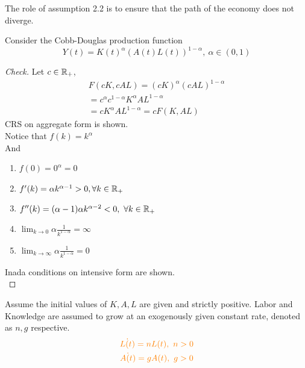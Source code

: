 \documentclass[11pt]{article}
\begin{document}
			\begin{remark}	
			The role of assumption 2.2 is to ensure that the path of the economy does not diverge.
			\end{remark}
			
			\begin{example}
				Consider the Cobb-Douglas production function
				\[
					Y(t) = K(t)^\alpha (A(t)L(t))^{1 - \alpha},\ \alpha \in (0, 1)
				\]
				
				\begin{proof}[Check]
					Let $c \in \mathbb{R}_+$, 
					\begin{gather*}
						F(cK, cAL) = (cK)^\alpha (cAL)^{1 - \alpha} \\
						= c^\alpha c^{1-\alpha} K^\alpha AL^{1-\alpha} \\
						= cK^{\alpha} AL^{1-\alpha} = cF(K, AL)
					\end{gather*}
					CRS on aggregate form is shown. \\
					Notice that $f(k) = k^{\alpha}$ \\
					And 
					\begin{enumerate}
						\item $f(0) = 0^{\alpha} = 0$
						\item $f'(k) = \alpha k ^ {\alpha - 1} > 0, \forall k \in \mathbb{R}_+$
						\item $f''(k) = (\alpha - 1)\alpha k ^ {\alpha - 2} < 0, \ \forall k \in \mathbb{R}_+$
						\item $\lim_{k \to 0} \alpha \frac{1}{k^{1-\alpha}} = \infty$
						\item $\lim_{k \to \infty} \alpha \frac{1}{k^{1-\alpha}} = 0$
					\end{enumerate}
					Inada conditions on intensive form are shown. \\
				\end{proof}
			\end{example}
			
			\begin{assumption}
				Assume the initial values of $K, A, L$ are given and strictly positive. Labor and Knowledge are assumed to grow at an exogenously given constant rate, denoted as $n, g$ respective.
				\begin{gather}
				\textcolor{orange}{
					\dot{L(t)} = nL(t),\ n > 0 }\\
					\textcolor{orange}{
						\dot{A(t)} = gA(t),\ g > 0
					}
				\end{gather}
			\end{assumption}
			
\end{document}
